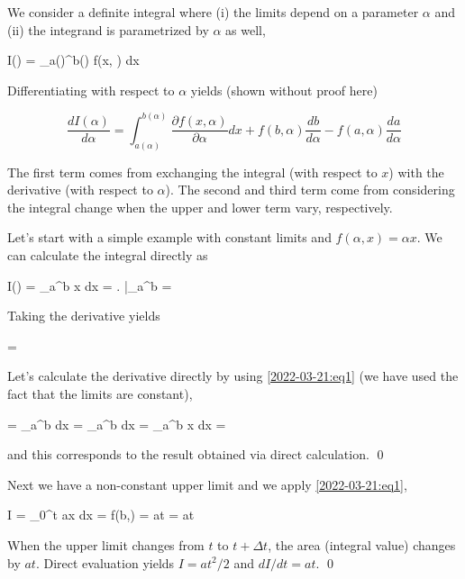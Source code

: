 
We consider a definite integral where (i) the limits depend on a parameter $\alpha$ and (ii) the integrand is parametrized by $\alpha$ as well,

\bee
I(\alpha) = \int_{a(\alpha)}^{b(\alpha)} f(x, \alpha) dx
\eee

Differentiating with respect to $\alpha$ yields (shown without proof here)

\begin{equation}\label{2022-03-21:eq1}
\boxed{
\frac{d I(\alpha)}{d \alpha} = \int_{a(\alpha)}^{b(\alpha)} \frac{ \partial f(x, \alpha) }{\partial \alpha } dx + f(b, \alpha) \frac{db}{d \alpha} - f(a, \alpha) \frac{da}{d \alpha}
}
\end{equation}

The first term comes from exchanging the integral (with respect to $x$) with the derivative (with respect to $\alpha$). The second and third term come from considering the integral change when the upper and lower term vary, respectively.

Let's start with a simple example with constant limits and $f(\alpha, x) = \alpha x$. We can calculate the integral directly as

\bee
I(\alpha) = \int_{a}^{b} \alpha x dx = \left.  \right|_a^b = 
\eee

Taking the derivative yields

\bee
{} = 
\eee

Let's calculate the derivative directly by using \eqref{2022-03-21:eq1} (we have used the fact that the limits are constant),

\bee
{} = \int_{a}^{b}  dx = \int_{a}^{b}  dx = \int_{a}^{b} x dx = 
\eee

and this corresponds to the result obtained via direct calculation. \qed

Next we have a non-constant upper limit and we apply \eqref{2022-03-21:eq1},

\bee
I = \int_0^t ax dx \quad {} = f(b,\alpha)  = at  = at
\eee

When the upper limit changes from $t$ to $t + \Delta t$, the area (integral value) changes by $at$. Direct evaluation yields $I = at^2/2$ and $dI/dt = at$. \qed

